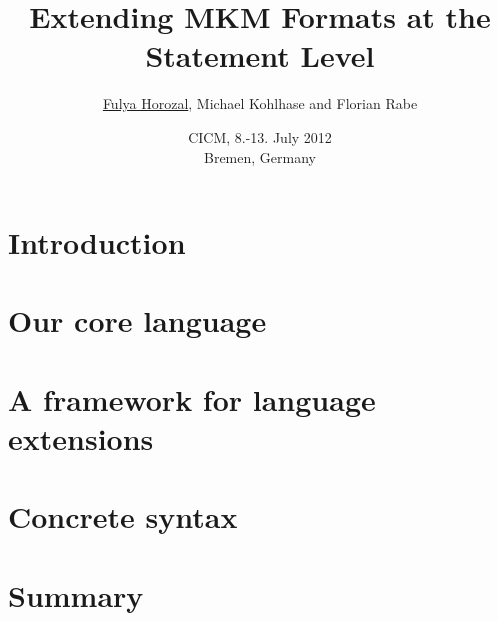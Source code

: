 \documentclass{beamer}
\begin{document}
\title{Extending MKM Formats at the \\ Statement Level}
\author{\underline{Fulya Horozal}, Michael Kohlhase and Florian Rabe}
\date{CICM, 8.-13. July 2012 \\ Bremen, Germany}
\begin{frame}
 \titlepage
\end{frame}

\section*{Introduction}



\section{Our core language}%


\section{A framework for language extensions}



\section{Concrete syntax} %


\section*{Summary}

\end{document}

